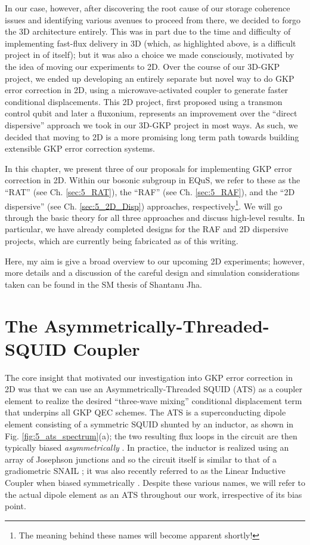 In our case, however, after discovering the root cause of our storage coherence issues and identifying various avenues to proceed from there, we decided to forgo the 3D architecture entirely. This was in part due to the time and difficulty of implementing fast-flux delivery in 3D (which, as highlighted above, is a difficult project in of itself); but it was also a choice we made consciously, motivated by the idea of moving our experiments to 2D. Over the course of our 3D-GKP project, we ended up developing an entirely separate but novel way to do GKP error correction in 2D, using a microwave-activated coupler to generate faster conditional displacements. This 2D project, first proposed using a transmon control qubit and later a fluxonium, represents an improvement over the ``direct dispersive'' approach we took in our 3D-GKP project in most ways. As such, we decided that moving to 2D is a more promising long term path towards building extensible GKP error correction systems. 

In this chapter, we present three of our proposals for implementing GKP error correction in 2D. Within our bosonic subgroup in EQuS, we refer to these as the ``RAT'' (see Ch. \ref{sec:5_RAT}), the ``RAF'' (see Ch. \ref{sec:5_RAF}), and the ``2D dispersive'' (see Ch. \ref{sec:5_2D_Disp}) approaches, respectively\footnote{The meaning behind these names will become apparent shortly!}. We will go through the basic theory for all three approaches and discuss high-level results. In particular, we have already completed designs for the RAF and 2D dispersive projects, which are currently being fabricated as of this writing. 

Here, my aim is give a broad overview to our upcoming 2D experiments; however, more details and a discussion of the careful design and simulation considerations taken can be found in the SM thesis of Shantanu Jha. 
\clearpage


\section{The Asymmetrically-Threaded-SQUID Coupler \label{sec:5_RAT}}

The core insight that motivated our investigation into GKP error correction in 2D was that we can use an Asymmetrically-Threaded SQUID (ATS) as a coupler element to realize the desired ``three-wave mixing'' conditional displacement term that underpins all GKP QEC schemes. The ATS is a superconducting dipole element consisting of a symmetric SQUID shunted by an inductor, as shown in Fig. \ref{fig:5_ats_spectrum}(a); the two resulting flux loops in the circuit are then typically biased \textit{asymmetrically} \cite{lescanne2020exponential, berdou2023one}. In practice, the inductor is realized using an array of Josephson junctions and so the circuit itself is similar to that of a gradiometric SNAIL \cite{miano2022frequency}; it was also recently referred to as the Linear Inductive Coupler when biased symmetrically \cite{maiti2024ancilla}. Despite these various names, we will refer to the actual dipole element as an ATS throughout our work, irrespective of its bias point. 

